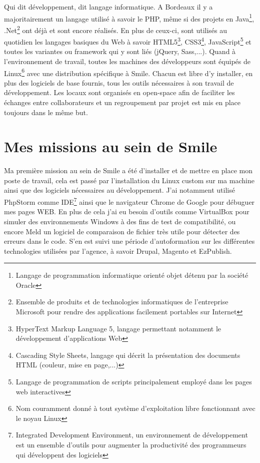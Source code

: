 \documentclass[a4paper,11pt,twoside]{report}
\begin{document}
  Qui dit développement, dit langage informatique. A Bordeaux il y a majoritairement un langage utilisé à savoir le PHP, même si des projets en Java\footnote{ Langage de programmation informatique orienté objet détenu par la société Oracle}, .Net\footnote{Ensemble de produits et de technologies informatiques de l'entreprise Microsoft pour rendre des applications facilement portables sur Internet} ont déjà et sont encore réalisés. En plus de ceux-ci, sont utilisés au quotidien les langages basiques du Web à savoir HTML5\footnote{HyperText Markup Language 5, langage permettant notamment le développement d'applications Web}, CSS3\footnote{Cascading Style Sheets, langage qui décrit la présentation des documents HTML (couleur, mise en page,...)}, JavaScript\footnote{Langage de programmation de scripts principalement employé dans les pages web interactives} et toutes les variantes ou framework qui y sont liés (jQuery, Sass,...). Quand à l'environnement de travail, toutes les machines des développeurs sont équipés de Linux\footnote{Nom couramment donné à tout système d'exploitation libre fonctionnant avec le noyau Linux} avec une distribution spécifique à Smile. Chacun est libre d'y installer, en plus des logiciels de base fournis, tous les outils nécessaires à son travail de développement. Les locaux sont organisés en open-space afin de faciliter les échanges entre collaborateurs et un regroupement par projet est mis en place toujours dans le même but.
  
  \section{Mes missions au sein de Smile}
  Ma première mission au sein de Smile a été d'installer et de mettre en place mon poste de travail, cela est passé par l'installation du Linux custom sur ma machine ainsi que des logiciels nécessaires au développement. J'ai notamment utilisé PhpStorm comme IDE\footnote{Integrated Development Environment, un environnement de développement est un ensemble d'outils pour augmenter la productivité des programmeurs qui développent des logiciels} ainsi que le navigateur Chrome de Google pour débuguer mes pages WEB. En plus de cela j'ai eu besoin d'outils comme VirtualBox pour simuler des environnements Windows à des fins de test de compatibilité, ou encore Meld un logiciel de comparaison de fichier très utile pour détecter des erreurs dans le code. S'en est suivi une période d'autoformation sur les différentes technologies utilisées par l'agence, à savoir Drupal, Magento et EzPublish.\newline 
    
\end{document}
